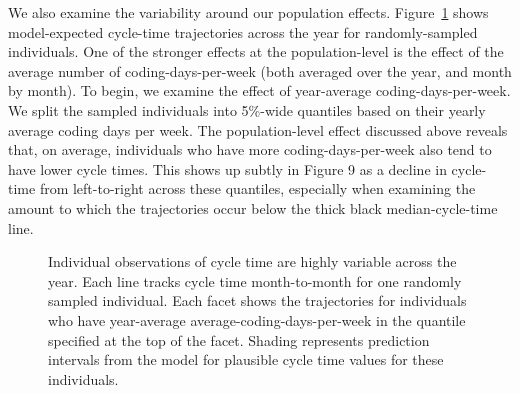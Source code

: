 \documentclass[manuscript,screen,review]{acmart}
\begin{document}
We also examine the variability around our population effects.
Figure~\ref{fig-bw-ct-traj} shows model-expected cycle-time trajectories
across the year for randomly-sampled individuals. One of the stronger
effects at the population-level is the effect of the average number of
coding-days-per-week (both averaged over the year, and month by month).
To begin, we examine the effect of year-average coding-days-per-week. We
split the sampled individuals into 5\%-wide quantiles based on their
yearly average coding days per week. The population-level effect
discussed above reveals that, on average, individuals who have more
coding-days-per-week also tend to have lower cycle times. This shows up
subtly in Figure 9 as a decline in cycle-time from left-to-right across
these quantiles, especially when examining the amount to which the
trajectories occur below the thick black median-cycle-time line.

\begin{figure}


\caption[Individual observations of cycle time are highly variable
across the year]{\label{fig-bw-ct-traj}Individual observations of cycle
time are highly variable across the year. Each line tracks cycle time
month-to-month for one randomly sampled individual. Each facet shows the
trajectories for individuals who have year-average
average-coding-days-per-week in the quantile specified at the top of the
facet. Shading represents prediction intervals from the model for
plausible cycle time values for these individuals.}

\end{figure}%
\end{document}

